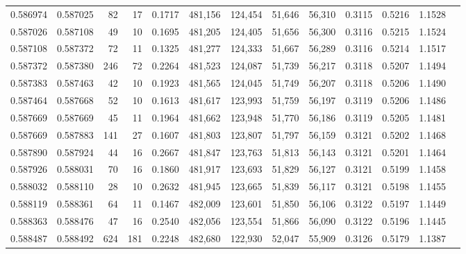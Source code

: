 \begin{tabular}{rrrrrrrrrrrrr}
0.586974 & 0.587025 &    82 &  17 &                                     0.1717 & 481,156 & 124,454 &  51,646 &  56,310 & 0.3115 & 0.5216 & 1.1528 \\
0.587026 & 0.587108 &    49 &  10 &                                     0.1695 & 481,205 & 124,405 &  51,656 &  56,300 & 0.3116 & 0.5215 & 1.1524 \\
0.587108 & 0.587372 &    72 &  11 &                                     0.1325 & 481,277 & 124,333 &  51,667 &  56,289 & 0.3116 & 0.5214 & 1.1517 \\
0.587372 & 0.587380 &   246 &  72 &                                     0.2264 & 481,523 & 124,087 &  51,739 &  56,217 & 0.3118 & 0.5207 & 1.1494 \\
0.587383 & 0.587463 &    42 &  10 &                                     0.1923 & 481,565 & 124,045 &  51,749 &  56,207 & 0.3118 & 0.5206 & 1.1490 \\
0.587464 & 0.587668 &    52 &  10 &                                     0.1613 & 481,617 & 123,993 &  51,759 &  56,197 & 0.3119 & 0.5206 & 1.1486 \\
0.587669 & 0.587669 &    45 &  11 &                                     0.1964 & 481,662 & 123,948 &  51,770 &  56,186 & 0.3119 & 0.5205 & 1.1481 \\
0.587669 & 0.587883 &   141 &  27 &                                     0.1607 & 481,803 & 123,807 &  51,797 &  56,159 & 0.3121 & 0.5202 & 1.1468 \\
0.587890 & 0.587924 &    44 &  16 &                                     0.2667 & 481,847 & 123,763 &  51,813 &  56,143 & 0.3121 & 0.5201 & 1.1464 \\
0.587926 & 0.588031 &    70 &  16 &                                     0.1860 & 481,917 & 123,693 &  51,829 &  56,127 & 0.3121 & 0.5199 & 1.1458 \\
0.588032 & 0.588110 &    28 &  10 &                                     0.2632 & 481,945 & 123,665 &  51,839 &  56,117 & 0.3121 & 0.5198 & 1.1455 \\
0.588119 & 0.588361 &    64 &  11 &                                     0.1467 & 482,009 & 123,601 &  51,850 &  56,106 & 0.3122 & 0.5197 & 1.1449 \\
0.588363 & 0.588476 &    47 &  16 &                                     0.2540 & 482,056 & 123,554 &  51,866 &  56,090 & 0.3122 & 0.5196 & 1.1445 \\
0.588487 & 0.588492 &   624 & 181 &                                     0.2248 & 482,680 & 122,930 &  52,047 &  55,909 & 0.3126 & 0.5179 & 1.1387 \\

\end{tabular}

